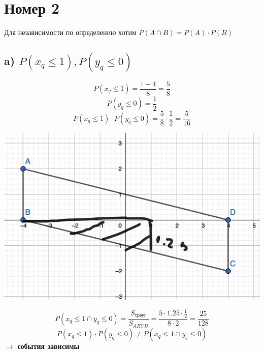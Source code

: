 \documentclass[a4paper,12pt]{article}
\begin{document}
\section*{Номер 2}
Для независимости по определению хотим $P(A \cap B) = P(A) \cdot P(B)$
\subsection*{a) $P(x_q \leq 1), P(y_q \leq 0)$}
\[
P(x_q \leq 1) = \frac{1 + 4}{8} = \frac{5}{8} 
\]
\[
P(y_q \leq 0) = \frac{1}{2}
\]
\[
P(x_q \leq 1) \cdot P(y_q \leq 0) = \frac{5}{8}\cdot \frac12 = \frac{5}{16}
\]
\begin{center}
\includegraphics[scale=0.4]{3.png}
\end{center}
\[
P(x_q \leq 1 \cap y_q \leq 0) = \frac{S_{\text{треуг}}}{S_{ABCD}} = \frac{5 \cdot 1.25 \cdot \frac{1}{2}}{8 \cdot 2} = \frac{25}{128}
\]
\[
P(x_q \leq 1) \cdot P(y_q \leq 0) \neq P(x_q \leq 1 \cap y_q \leq 0)
\]
$\rightarrow$ \textbf{события зависимы}
\end{document}
